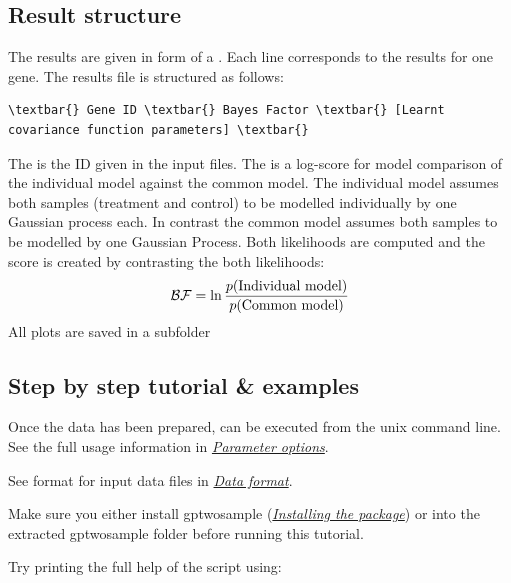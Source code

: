 \documentclass[letterpaper,10pt,english]{sphinxmanual}
\begin{document}
\subsection{Result structure}
\label{results:result-structure}\label{results::doc}\label{results:results}
The results are given in form of a . Each line corresponds to the results for one gene. The results file is structured as follows:

\begin{Verbatim}[commandchars=\\\{\}]
\textbar{} Gene ID \textbar{} Bayes Factor \textbar{} [Learnt covariance function parameters] \textbar{}
\end{Verbatim}

The  is the ID given in the input files. The  is a log-score for model comparison of the individual model against the common model. The individual model assumes both samples (treatment and control) to be modelled individually by one Gaussian process each. In contrast the common model assumes both samples to be modelled by one Gaussian Process. Both likelihoods are computed and the score is created by contrasting the both likelihoods:
\begin{gather}
\begin{split}\mathcal{BF} = \ln \frac{p(\text{Individual model})}{p(\text{Common model})}\end{split}\notag
\end{gather}
All plots are saved in a subfolder 


\subsection{Step by step tutorial \& examples}
\label{tutorial:step-by-step-tutorial-examples}\label{tutorial::doc}
Once the data has been prepared,  can be executed from
the unix command line. See the full usage information in {\hyperref[usage:usage]{\emph{Parameter options}}}.

See format for input data  files in {\hyperref[usage:dataformat]{\emph{Data format}}}.

Make sure you either install gptwosample ({\hyperref[tutorial:install]{\emph{Installing the package}}}) or 
into the extracted gptwosample folder before running this tutorial.

Try printing the full help of the script using:
\end{document}
